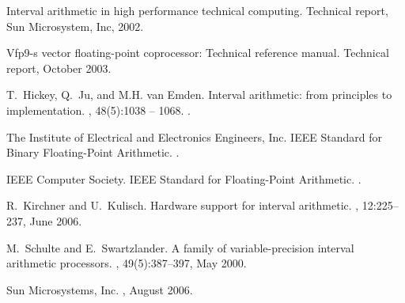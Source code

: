\documentclass[11pt]{article}
\begin{document}
\begin{thebibliography}{1}

Interval arithmetic in high performance technical computing.
\newblock Technical report, Sun Microsystem, Inc, 2002.

Vfp9-s vector floating-point coprocessor: Technical reference manual.
\newblock Technical report, October 2003.

T.~Hickey, Q.~Ju, and M.H. van Emden.
\newblock Interval arithmetic: from principles to implementation.
, 48(5):1038 -- 1068.
.

The Institute of Electrical and Electronics Engineers, Inc.
\newblock IEEE Standard for Binary Floating-Point Arithmetic.
.

IEEE Computer Society.
\newblock IEEE Standard for Floating-Point Arithmetic.
.

R.~Kirchner and U.~Kulisch.
\newblock Hardware support for interval arithmetic.
, 12:225--237, June 2006.

M.~Schulte and E.~Swartzlander.
\newblock A family of variable-precision interval arithmetic processors.
, 49(5):387--397, May 2000.

Sun Microsystems, Inc.
, August 2006.

\end{thebibliography}
\end{document}
